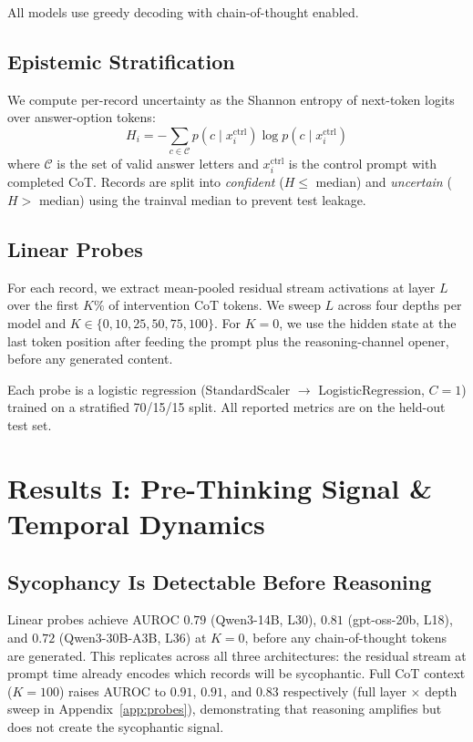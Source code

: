 \documentclass[11pt]{article}
\begin{document}
All models use greedy decoding with chain-of-thought enabled.

\subsection{Epistemic Stratification}

We compute per-record uncertainty as the Shannon entropy of next-token logits over answer-option tokens:
\begin{equation}
    H_i = -\sum_{c \in \mathcal{C}} p(c \mid x_i^{\text{ctrl}}) \log p(c \mid x_i^{\text{ctrl}})
\end{equation}
where $\mathcal{C}$ is the set of valid answer letters and $x_i^{\text{ctrl}}$ is the control prompt with completed CoT.
Records are split into \emph{confident} ($H \leq$ median) and \emph{uncertain} ($H >$ median) using the trainval median to prevent test leakage.

\subsection{Linear Probes}

For each record, we extract mean-pooled residual stream activations at layer $L$ over the first $K\%$ of intervention CoT tokens.
We sweep $L$ across four depths per model and $K \in \{0, 10, 25, 50, 75, 100\}$.
For $K{=}0$, we use the hidden state at the last token position after feeding the prompt plus the reasoning-channel opener, before any generated content.

Each probe is a logistic regression (StandardScaler $\to$ LogisticRegression, $C{=}1$) trained on a stratified 70/15/15 split.
All reported metrics are on the held-out test set.


\section{Results I: Pre-Thinking Signal \& Temporal Dynamics}
\label{sec:results1}

\subsection{Sycophancy Is Detectable Before Reasoning}

Linear probes achieve AUROC $0.79$ (Qwen3-14B, L30), $0.81$ (gpt-oss-20b, L18), and $0.72$ (Qwen3-30B-A3B, L36) at $K{=}0$, before any chain-of-thought tokens are generated.
This replicates \citet{mirtaheri2026motivated} across all three architectures: the residual stream at prompt time already encodes which records will be sycophantic.
Full CoT context ($K{=}100$) raises AUROC to $0.91$, $0.91$, and $0.83$ respectively (full layer $\times$ depth sweep in Appendix~\ref{app:probes}), demonstrating that reasoning amplifies but does not create the sycophantic signal.
\end{document}
